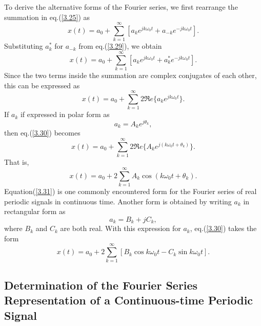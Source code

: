 \documentclass[a4paper,10pt,twoside]{book}
\begin{document}
To derive the alternative forms of the Fourier series, we first rearrange the summation in eq.\;(\ref{3.25}) as $$    x(t) = a_{0}+\sum_{k=1}^{\infty}[a_{k}e^{jk\omega_{0}t} + a_{-k}e^{-jk\omega_{0}t}].$$ Substituting $a_k^*$ for $a_{-k}$ from eq.\;(\ref{3.29}), we obtain $$x(t)=a_0+\sum_{k=1}^\infty[a_ke^{jk\omega_0t}+a_k^*e^{-jk\omega_0t}].$$ Since the two terms inside the summation are complex conjugates of each other, this can be expressed as
\begin{equation}
    x(t)=a_0+\sum_{k=1}^\infty2\Re e\{a_ke^{jk\omega_0t}\}.
    \label{3.30}
\end{equation}
If $a_k$ if expressed in polar form as $$a_k=A_ke^{j\theta_k},$$ then eq.\;(\ref{3.30}) becomes $$x(t) = a_0 + \sum_{k=1}^{\infty}2\Re e\{A_ke^{j(k\omega_0t+\theta_k)}\}.$$ That is,
\begin{equation}
    x(t)=a_0+2\sum_{k=1}^\infty A_k\cos(k\omega_0t+\theta_k).
    \label{3.31}
\end{equation}
Equation\;(\ref{3.31}) is one commonly encountered form for the Fourier series of real periodic signals in continuous time. Another form is obtained by writing $a_k$ in rectangular form as $$a_k=B_k+jC_k,$$ where $B_k$ and $C_k$ are both real. With this expression for $a_k$, eq.\;(\ref{3.30}) takes the form
\begin{equation}
    x(t)=a_0+2\sum_{k=1}^\infty[B_k\cos k\omega_0t-C_k\sin k\omega_0t].
    \label{3.32}
\end{equation}

\subsection{Determination of the Fourier Series Representation of a Continuous-time Periodic Signal}
\end{document}

